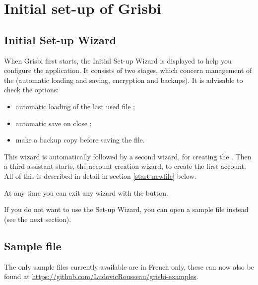 

\chapter{Initial set-up of Grisbi\label{start}}


\section{Initial Set-up Wizard\label{start-first}}


When Grisbi first starts, the Initial Set-up Wizard is displayed to
help you configure the application. It consists of two stages, which concern
management of the   (automatic loading and saving,
encryption and backups).
It is advisable to check the options:

\begin{itemize}
 \item automatic loading of the last used file  ;
 \item automatic save on close ;
 \item make a backup copy before saving the file.
\end{itemize}

This wizard is automatically followed by a second wizard, for creating the  . Then a third assistant starts, the account creation wizard, to create the first account. All of this is described in detail in section \ref{start-newfile}  below.

At any time you can exit any wizard with the  button.

If you do not want to use the Set-up Wizard, you can open a sample file instead (see the next section).

\section{Sample file\label{start-example}}
 The only sample files currently available are in French only, these can now also be found at \url{https://github.com/LudovicRousseau/grisbi-examples}.

